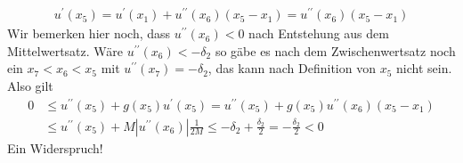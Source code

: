 \begin{solution}
\begin{enumerate}[label = (\roman*)]
\begin{align*}
		u^\prime(x_5) = u^\prime(x_1) + u^{\prime\prime}(x_6) (x_5 - x_1) = u^{\prime\prime}(x_6) (x_5 - x_1)
		\end{align*}
		Wir bemerken hier noch, dass $u^{\prime\prime}(x_6) < 0$ nach Entstehung aus dem Mittelwertsatz. Wäre $u^{\prime\prime}(x_6) < -\delta_2$ so gäbe es nach dem Zwischenwertsatz noch ein $x_7 < x_6 < x_5$ mit $u^{\prime\prime}(x_7) = -\delta_2$, das kann nach Definition von $x_5$ nicht sein. Also gilt
		\begin{align*}
		0 &\leq u^{\prime\prime}(x_5) + g(x_5) u^\prime (x_5) = u^{\prime\prime}(x_5) + g(x_5) u^{\prime\prime}(x_6)(x_5 - x_1) \\
		&\leq u^{\prime\prime}(x_5) + M |u^{\prime\prime}(x_6)| \frac{1}{2M} \leq -\delta_2 + \frac{\delta_2}{2} = -\frac{\delta_2}{2} < 0
		\end{align*}
		Ein Widerspruch!
	\end{enumerate}


\end{solution}

